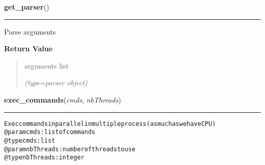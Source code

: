 \hspace{.8\funcindent}\begin{boxedminipage}{\funcwidth}

    \raggedright \textbf{get\_parser}()

    \vspace{-1.5ex}

    \rule{\textwidth}{0.5\fboxrule}
\setlength{\parskip}{2ex}
    Parse arguments

\setlength{\parskip}{1ex}
      \textbf{Return Value}
    \vspace{-1ex}

      \begin{quote}
      arguments list

      {\it (type=parser object)}

      \end{quote}

    \end{boxedminipage}

    \label{script-SNP_INDEL_merge:exec_commands}

    \vspace{0.5ex}

\hspace{.8\funcindent}\begin{boxedminipage}{\funcwidth}

    \raggedright \textbf{exec\_commands}(\textit{cmds}, \textit{nbThreads})

    \vspace{-1.5ex}

    \rule{\textwidth}{0.5\fboxrule}
\setlength{\parskip}{2ex}
\begin{alltt}

Exec commands in parallel in multiple process (as much as we have CPU)
@param cmds: list of commands
    @type cmds: list
    @param nbThreads: number of threads to use
    @type nbThreads: integer
\end{alltt}

\setlength{\parskip}{1ex}
    \end{boxedminipage}

    \label{script-SNP_INDEL_merge:main}

    \vspace{0.5ex}

